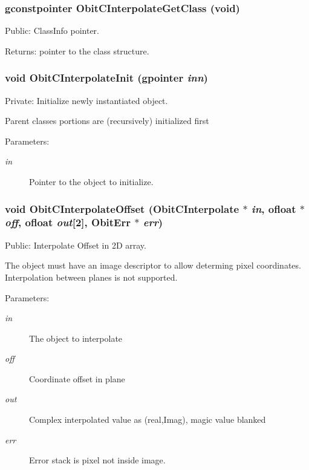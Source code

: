 \subsubsection{\setlength{\rightskip}{0pt plus 5cm}gconstpointer Obit\-CInterpolate\-Get\-Class (void)}\label{ObitCInterpolate_8c_a11}


Public: Class\-Info pointer. 

\begin{Desc}
\item[Returns:]pointer to the class structure. \end{Desc}
\subsubsection{\setlength{\rightskip}{0pt plus 5cm}void Obit\-CInterpolate\-Init (gpointer {\em inn})}\label{ObitCInterpolate_8c_a3}


Private: Initialize newly instantiated object. 

Parent classes portions are (recursively) initialized first \begin{Desc}
\item[Parameters:]
\begin{description}
\item[{\em in}]Pointer to the object to initialize. \end{description}
\end{Desc}
\subsubsection{\setlength{\rightskip}{0pt plus 5cm}void Obit\-CInterpolate\-Offset ({\bf Obit\-CInterpolate} $\ast$ {\em in}, {\bf ofloat} $\ast$ {\em off}, {\bf ofloat} {\em out}[2], {\bf Obit\-Err} $\ast$ {\em err})}\label{ObitCInterpolate_8c_a18}


Public: Interpolate Offset in 2D array. 

The object must have an image descriptor to allow determing pixel coordinates. Interpolation between planes is not supported. \begin{Desc}
\item[Parameters:]
\begin{description}
\item[{\em in}]The object to interpolate \item[{\em off}]Coordinate offset in plane \item[{\em out}]Complex interpolated value as (real,Imag), magic value blanked \item[{\em err}]Error stack is pixel not inside image. \end{description}
\end{Desc}
